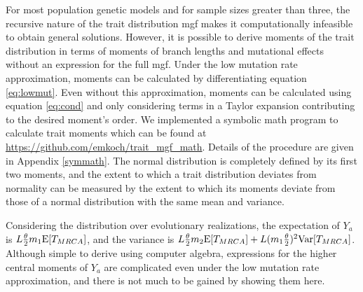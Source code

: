 \newcommand{\AAA}{\E[\mathbbm{T}_{4,4}] + \frac{1}{3}\E[\mathbbm{T}_{3,4}] + \frac{2}{9}\E[\mathbbm{T}_{2,4}]}
\newcommand{\BBB}{\frac{1}{9}\E[\mathbbm{T}_{2,4}] + \frac{1}{6}\E[\mathbbm{T}_{3,4}]}
\newcommand{\CCC}{\E[\mathbbm{T}_{4,4}] - \frac{1}{6}\E[\mathbbm{T}_{3,4}] - \frac{1}{9}\E[\mathbbm{T}_{2,4}]}

For most population genetic models and for sample sizes greater than three, the
recursive nature of the trait distribution mgf makes it computationally
infeasible to obtain general solutions. However, it is possible to derive
moments of the trait distribution in terms of moments of branch lengths and
mutational effects without an expression for the full mgf. Under the low
mutation rate approximation, moments can be calculated by differentiating
equation \eqref{eq:lowmut}. Even without this approximation, moments can be
calculated using equation \eqref{eq:cond} and only considering terms in a Taylor
expansion contributing to the desired moment's order. We implemented a symbolic
math program to calculate trait moments which can be found at
\url{https://github.com/emkoch/trait_mgf_math}. Details of the procedure are
given in Appendix \ref{symmath}. The normal distribution is completely defined
by its first two moments, and the extent to which a trait distribution deviates
from normality can be measured by the extent to which its moments deviate from
those of a normal distribution with the same mean and variance.

Considering the distribution over evolutionary realizations, the expectation of
$Y_a$ is $L \frac{\theta}{2} m_1 \mathrm{E}[T_{MRCA}]$, and the variance is $L \frac{\theta}{2} m_2 \mathrm{E}[T_{MRCA}] +
L(m_1\frac{\theta}{2})^2\mathrm{Var}[T_{MRCA}]$. Although simple to derive using computer algebra,
expressions for the higher central moments of $Y_a$ are complicated even under
the low mutation rate approximation, and there is not much to be gained by
showing them here.

